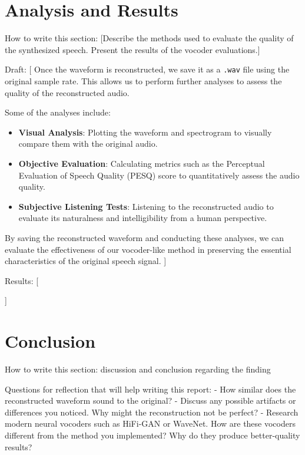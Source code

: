 \documentclass[12pt]{article}
\begin{document}
\newpage






\section{Analysis and Results}
How to write this section: [Describe the methods used to evaluate the quality of the synthesized speech. Present the results of the vocoder evaluations.]

Draft: [
Once the waveform is reconstructed, we save it as a \texttt{.wav} file using the original sample rate. This allows us to perform further analyses to assess the quality of the reconstructed audio.

Some of the analyses include:

\begin{itemize}
    \item \textbf{Visual Analysis}: Plotting the waveform and spectrogram to visually compare them with the original audio.
    \item \textbf{Objective Evaluation}: Calculating metrics such as the Perceptual Evaluation of Speech Quality (PESQ) score to quantitatively assess the audio quality.
    \item \textbf{Subjective Listening Tests}: Listening to the reconstructed audio to evaluate its naturalness and intelligibility from a human perspective.
\end{itemize}

By saving the reconstructed waveform and conducting these analyses, we can evaluate the effectiveness of our vocoder-like method in preserving the essential characteristics of the original speech signal.
]

Results: [

]


\section{Conclusion}
How to write this section: discussion and conclusion regarding the finding

Questions for reflection that will help writing this report:
- How similar does the reconstructed waveform sound to the original?
- Discuss any possible artifacts or differences you noticed. Why might the reconstruction not be perfect?
- Research modern neural vocoders such as HiFi-GAN or WaveNet. How are these vocoders different from the method you implemented? Why do they produce better-quality results?


\newpage


\end{document}
